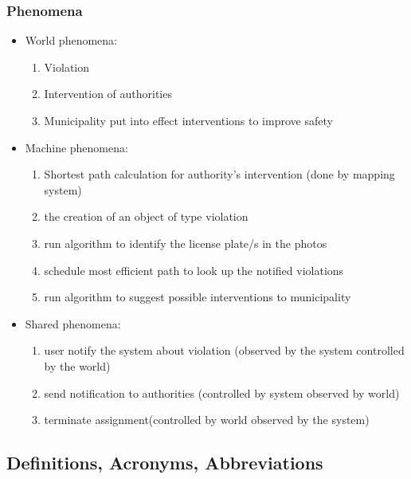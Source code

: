 \subsubsection{Phenomena}
\begin{itemize}
\item
World phenomena:
\begin{enumerate}
\item
Violation
\item
Intervention of authorities
\item
Municipality put into effect interventions to improve safety
\end{enumerate}
\item
Machine phenomena:	
\begin{enumerate}
\item
Shortest path calculation for authority’s intervention (done by mapping system)
\item
the creation of an object of type violation
\item
run algorithm to identify the license plate/s in the photos
\item
schedule most efficient path to look up the notified violations
\item
run algorithm to suggest possible interventions to municipality
\end{enumerate}
\item
Shared phenomena:
\begin{enumerate}
\item
user notify the system about violation (observed by the system controlled by the world)
\item
send notification to authorities (controlled by system observed by world)
\item 
terminate assignment(controlled by world observed by the system)  
\end{enumerate}
\end{itemize}
\subsection{Definitions, Acronyms, Abbreviations}
